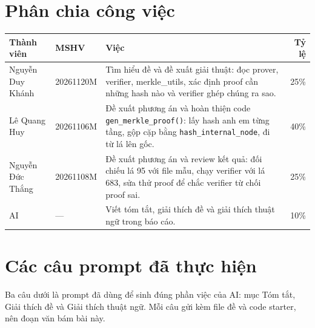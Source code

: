 \documentclass[12pt,a4paper]{article}
\begin{document}
\section{Phân chia công việc}

\begin{tabularx}{\textwidth}{@{}l l >{\raggedright\arraybackslash}X r@{}}
\toprule
Thành viên & MSHV & Việc & Tỷ lệ \\
\midrule
Nguyễn Duy Khánh & 20261120M &
Tìm hiểu đề và đề xuất giải thuật: đọc prover, verifier, merkle\_utils, xác định proof cần những hash nào và verifier ghép chúng ra sao. & 25\% \\
\addlinespace
Lê Quang Huy & 20261106M &
Đề xuất phương án và hoàn thiện code \texttt{gen\_merkle\_proof()}: lấy hash anh em từng tầng, gộp cặp bằng \texttt{hash\_internal\_node}, đi từ lá lên gốc. & 40\% \\
\addlinespace
Nguyễn Đức Thắng & 20261108M &
Đề xuất phương án và review kết quả: đối chiếu lá 95 với file mẫu, chạy verifier với lá 683, sửa thử proof để chắc verifier từ chối proof sai. & 25\% \\
\addlinespace
AI & --- &
Viết tóm tắt, giải thích đề và giải thích thuật ngữ trong báo cáo. & 10\% \\
\bottomrule
\end{tabularx}

\section{Các câu prompt đã thực hiện}

Ba câu dưới là prompt đã dùng để sinh đúng phần việc của AI: mục Tóm tắt, Giải thích đề và Giải thích thuật ngữ. Mỗi câu gửi kèm file đề và code starter, nên đoạn văn bám bài này.
\end{document}
